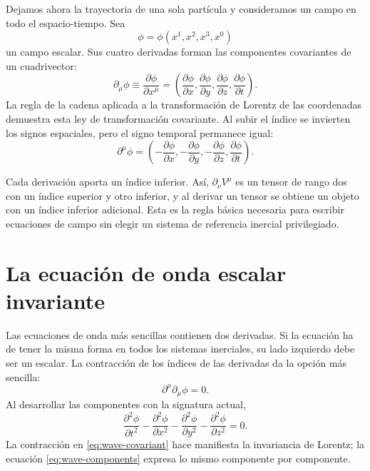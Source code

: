 Dejamos ahora la trayectoria de una sola partícula y consideramos un campo en todo el espacio-tiempo. Sea \begin{equation}
  \phi=\phi(x^1,x^2,x^3,x^0)
\end{equation} un campo escalar. Sus cuatro derivadas forman las componentes covariantes de un cuadrivector: \begin{equation}
  \partial_\mu\phi
  \equiv\frac{\partial\phi}{\partial x^\mu}
  =\left(
    \frac{\partial\phi}{\partial x},
    \frac{\partial\phi}{\partial y},
    \frac{\partial\phi}{\partial z},
    \frac{\partial\phi}{\partial t}
  \right).
\end{equation} La regla de la cadena aplicada a la transformación de Lorentz de las coordenadas demuestra esta ley de transformación covariante. Al subir el índice se invierten los signos espaciales, pero el signo temporal permanece igual: \begin{equation}
  \partial^\mu\phi
  =\left(
    -\frac{\partial\phi}{\partial x},
    -\frac{\partial\phi}{\partial y},
    -\frac{\partial\phi}{\partial z},
    \frac{\partial\phi}{\partial t}
  \right).
\end{equation}

Cada derivación aporta un índice inferior. Así, \(\partial_\nu V^\mu\) es un tensor de rango dos con un índice superior y otro inferior, y al derivar un tensor se obtiene un objeto con un índice inferior adicional. Esta es la regla básica necesaria para escribir ecuaciones de campo sin elegir un sistema de referencia inercial privilegiado.

\section{La ecuación de onda escalar invariante}

Las ecuaciones de onda más sencillas contienen dos derivadas. Si la ecuación ha de tener la misma forma en todos los sistemas inerciales, su lado izquierdo debe ser un escalar. La contracción de los índices de las derivadas da la opción más sencilla: \begin{equation}
  \boxed{\partial^\mu\partial_\mu\phi=0.}
  \label{eq:wave-covariant}
\end{equation} Al desarrollar las componentes con la signatura actual, \begin{equation}
  \frac{\partial^2\phi}{\partial t^2}
  -\frac{\partial^2\phi}{\partial x^2}
  -\frac{\partial^2\phi}{\partial y^2}
  -\frac{\partial^2\phi}{\partial z^2}=0.
  \label{eq:wave-components}
\end{equation} La contracción en \eqref{eq:wave-covariant} hace manifiesta la invariancia de Lorentz; la ecuación \eqref{eq:wave-components} expresa lo mismo componente por componente.

